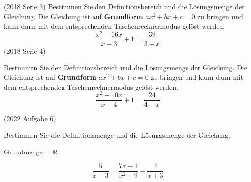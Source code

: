 (2018 Serie 3)
Bestimmen Sie den Definitionsbereich und die Lösungsmenge der Gleichung.
Die Gleichung ist auf \textbf{Grundform} $ax^2 + bx + c = 0$ zu bringen und kann dann mit
dem entsprechenden Taschenrechnermodus gelöst werden.
$$\frac{x^2-16x}{x-3} + 1 = \frac{39}{3-x}$$
(2018 Serie 4)

Bestimmen Sie den Definitionsbereich und die Lösungsmenge der Gleichung.
Die Gleichung ist auf \textbf{Grundform}
$ax^2 + bx + c = 0$ zu bringen und kann dann
mit dem entsprechenden Taschenrechnermodus gelöst werden.
$$\frac{x^2-10x}{x-4} + 1 = \frac{24}{4-x}$$


(2022 Aufgabe 6)

Bestimmen Sie die Definitionsmenge und die Lösungsmenge der Gleichung.

Grundmenge = $\mathbb{R}$


$$\frac5{x-3}   = \frac{7x-1}{x^2-9}   -    \frac4{x+3}$$







